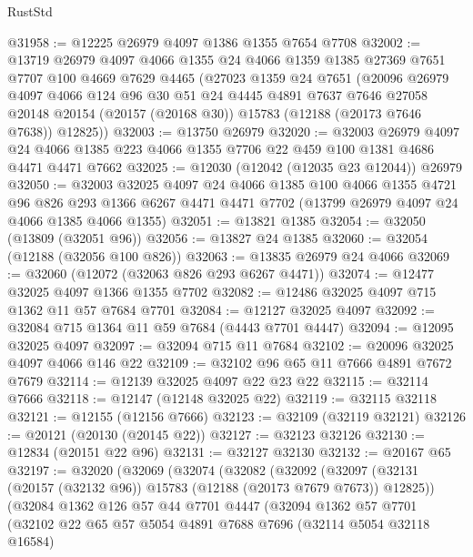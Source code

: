 \begin{lexlean}{RustStd}
\begin{coremodule}
@31958 := @12225 @26979 @4097 @1386 @1355 @7654 @7708
@32002 := @13719
    @26979
    @4097
    @4066
    @1355
    @24
    @4066
    @1359
    @1385
    @27369
    @7651
    @7707
    @100
    @4669
    @7629
    @4465
    (@27023
      @1359
      @24
      @7651
      (@20096
        @26979
        @4097
        @4066
        @124
        @96
        @30
        @51
        @24
        @4445
        @4891
        @7637
        @7646
        @27058
        @20148
        @20154
        (@20157 (@20168 @30))
        @15783
        (@12188 (@20173 @7646 @7638))
        @12825))
@32003 := @13750 @26979
@32020 := @32003
    @26979
    @4097
    @24
    @4066
    @1385
    @223
    @4066
    @1355
    @7706
    @22
    @459
    @100
    @1381
    @4686
    @4471
    @4471
    @7662
@32025 := @12030 (@12042 (@12035 @23 @12044)) @26979
@32050 := @32003
    @32025
    @4097
    @24
    @4066
    @1385
    @100
    @4066
    @1355
    @4721
    @96
    @826
    @293
    @1366
    @6267
    @4471
    @4471
    @7702
    (@13799 @26979 @4097 @24 @4066 @1385 @4066 @1355)
@32051 := @13821 @1385
@32054 := @32050 (@13809 (@32051 @96))
@32056 := @13827 @24 @1385
@32060 := @32054 (@12188 (@32056 @100 @826))
@32063 := @13835 @26979 @24 @4066
@32069 := @32060 (@12072 (@32063 @826 @293 @6267 @4471))
@32074 := @12477 @32025 @4097 @1366 @1355 @7702
@32082 := @12486 @32025 @4097 @715 @1362 @11 @57 @7684 @7701
@32084 := @12127 @32025 @4097
@32092 := @32084 @715 @1364 @11 @59 @7684 (@4443 @7701 @4447)
@32094 := @12095 @32025 @4097
@32097 := @32094 @715 @11 @7684
@32102 := @20096 @32025 @4097 @4066 @146 @22
@32109 := @32102 @96 @65 @11 @7666 @4891 @7672 @7679
@32114 := @12139 @32025 @4097 @22 @23 @22
@32115 := @32114 @7666
@32118 := @12147 (@12148 @32025 @22)
@32119 := @32115 @32118
@32121 := @12155 (@12156 @7666)
@32123 := @32109 (@32119 @32121)
@32126 := @20121 (@20130 (@20145 @22))
@32127 := @32123 @32126
@32130 := @12834 (@20151 @22 @96)
@32131 := @32127 @32130
@32132 := @20167 @65
@32197 := @32020
    (@32069
      (@32074
        (@32082
          (@32092
            (@32097 (@32131 (@20157 (@32132 @96)) @15783 (@12188 (@20173 @7679 @7673)) @12825))
            (@32084
              @1362
              @126
              @57
              @44
              @7701
              @4447
              (@32094
                @1362
                @57
                @7701
                (@32102
                  @22
                  @65
                  @57
                  @5054
                  @4891
                  @7688
                  @7696
                  (@32114 @5054 @32118 @16584)

\end{coremodule}
\end{lexlean}
